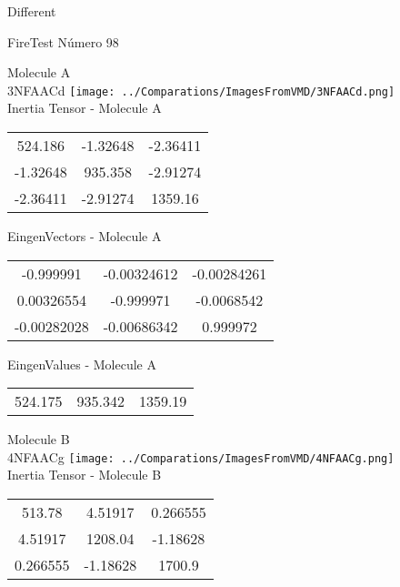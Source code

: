 \begin{center}
\vtab
\vtab
\textcolor{NavyBlue}{\Large Different}
\end{center}

 \newpage

\vtab[-2cm]
\begin{center}
{\large FireTest \tab Número 98}
\end{center}
\begin{multicols}{2}
\begin{center}

Molecule A \\ 
3NFAACd
\texttt{[image: ../Comparations/ImagesFromVMD/3NFAACd.png]}
\\
Inertia Tensor - Molecule A \\
\vtab

\begin{tabular}{|c c c|}
524.186	 & 	-1.32648	 & 	-2.36411	 \\
-1.32648	 & 	935.358	 & 	-2.91274	 \\
-2.36411	 & 	-2.91274	 & 	1359.16
\end{tabular}

\vtab
 EingenVectors - Molecule A     \\
\vtab
\begin{tabular}{|c c c|}
-0.999991	 & 	-0.00324612	 & 	-0.00284261	 \\
0.00326554	 & 	-0.999971	 & 	-0.0068542	 \\
-0.00282028	 & 	-0.00686342	 & 	0.999972
\end{tabular}

\vtab
 EingenValues - Molecule A     \\
\vtab
\begin{tabular}{|c c c|}
524.175	 & 	935.342	 & 	1359.19	 \\
\end{tabular}
\columnbreak

Molecule B \\ 
4NFAACg
\texttt{[image: ../Comparations/ImagesFromVMD/4NFAACg.png]}
\\
Inertia Tensor - Molecule B \\
\vtab

\begin{tabular}{|c c c|}
513.78	 & 	4.51917	 & 	0.266555	 \\
4.51917	 & 	1208.04	 & 	-1.18628	 \\
0.266555	 & 	-1.18628	 & 	1700.9
\end{tabular}


\end{center}
\end{multicols}
